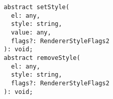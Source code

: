\begin{verbatim}
  abstract setStyle(
    el: any,
    style: string,
    value: any,
    flags?: RendererStyleFlags2
  ): void;
  abstract removeStyle(
    el: any,
    style: string,
    flags?: RendererStyleFlags2
  ): void;
\end{verbatim}
